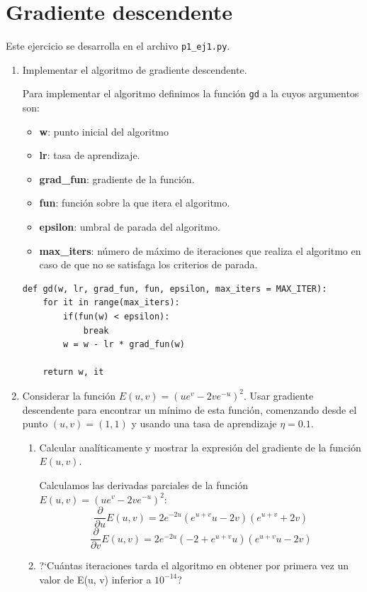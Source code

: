 \documentclass[size=a4, parskip=half, titlepage=false, toc=flat, toc=bib, 12pt]{scrartcl}
\begin{document}
\section{Gradiente descendente}
Este ejercicio se desarrolla en el archivo \verb|p1_ej1.py|.
\begin{enumerate}
\item Implementar el algoritmo de gradiente descendente.

Para implementar el algoritmo definimos la función \verb|gd| a la cuyos argumentos son:
\begin{itemize}
\item \textbf{w}: punto inicial del algoritmo
\item \textbf{lr}: tasa de aprendizaje.
\item \textbf{grad\_fun}: gradiente de la función.
\item \textbf{fun}: función sobre la que itera el algoritmo.
\item \textbf{epsilon}: umbral de parada del algoritmo.
\item \textbf{max\_iters}: número de máximo de iteraciones que realiza el algoritmo en caso
de que no se satisfaga los criterios de parada.
\end{itemize}

\begin{lstlisting}
def gd(w, lr, grad_fun, fun, epsilon, max_iters = MAX_ITER):
	for it in range(max_iters):
		if(fun(w) < epsilon):
			break
		w = w - lr * grad_fun(w)

	return w, it
\end{lstlisting}
\item Considerar la función $E(u,v) = (ue^v - 2ve^{-u})^2$. Usar gradiente descendente
para encontrar un mínimo de esta función, comenzando desde el punto $(u,v) = (1,1)$ y usando
una tasa de aprendizaje $\eta = 0.1$.
\begin{enumerate}
\item Calcular analíticamente y mostrar la expresión del gradiente de la función $E(u, v)$.

Calculamos las derivadas parciales de la función $E(u,v) = (ue^v - 2ve^{-u})^2$:
$$ \frac{\partial}{\partial u} E(u,v) = 2 e^{-2 u} (e^{u + v} u - 2 v) (e^{u + v} + 2 v) $$
$$ \frac{\partial}{\partial v} E(u,v) = 2 e^{-2 u} (-2 + e^{u + v} u) (e^{u + v} u - 2 v)$$

\item ?`Cuántas iteraciones tarda el algoritmo en obtener por primera vez un valor de E(u, v)
inferior a $10^{−14}$?


\end{enumerate}
\end{enumerate}
\end{document}
